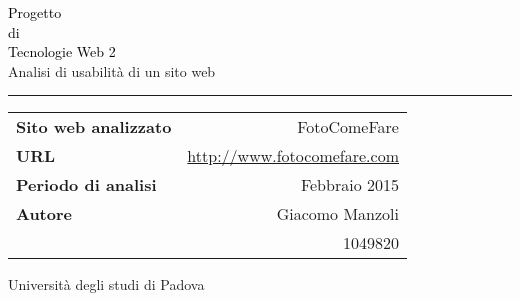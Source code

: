 \begin{titlepage}
\newlength{\drop} %
\textheight %

\vspace{\drop} %
\begin{center} %
\textcolor{Black}{ %
{\Huge Progetto}\\[0.5\baselineskip] %
{\Large di}\\[0.75\baselineskip] %
{\Huge Tecnologie Web 2}} %
\\[2\baselineskip]
{\Large Analisi di usabilità di un sito web}

\vspace{0.25\drop} %
\rule{1\textwidth}{0.4pt}\par %
\vspace{\drop} %

\begin{tabular}{l | r}

\textbf{Sito web analizzato} & FotoComeFare \\
\textbf{URL} & \url{http://www.fotocomefare.com} \\
\textbf{Periodo di analisi} & Febbraio 2015 \\

\textbf{Autore} & Giacomo Manzoli \\
& 1049820 \\


\end{tabular}

\end{center}

\vfill %
\vfill
\begin{center}
{\large Università degli studi di Padova}
\end{center}
\end{titlepage}
